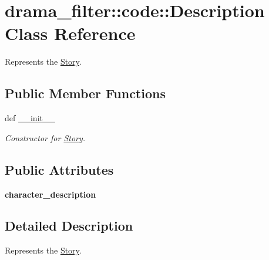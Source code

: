 \hypertarget{classdrama__filter_1_1code_1_1Description}{
\section{drama\_\-filter::code::Description Class Reference}
\label{classdrama__filter_1_1code_1_1Description}
}


Represents the \hyperlink{classdrama__filter_1_1code_1_1Story}{Story}.  


\subsection*{Public Member Functions}
\begin{DoxyCompactItemize}
\item 
def \hyperlink{classdrama__filter_1_1code_1_1Description_a4ccd26844a64d6fc83686a91e9d7c830}{\_\-\_\-init\_\-\_\-}
\begin{DoxyCompactList}\small\item\em Constructor for \hyperlink{classdrama__filter_1_1code_1_1Story}{Story}. \end{DoxyCompactList}\end{DoxyCompactItemize}
\subsection*{Public Attributes}
\begin{DoxyCompactItemize}
\item 
\hypertarget{classdrama__filter_1_1code_1_1Description_a830028ea0de9f2d60c398b8c79cc6d21}{
{\bfseries character\_\-description}}
\label{classdrama__filter_1_1code_1_1Description_a830028ea0de9f2d60c398b8c79cc6d21}

\end{DoxyCompactItemize}


\subsection{Detailed Description}
Represents the \hyperlink{classdrama__filter_1_1code_1_1Story}{Story}. 


